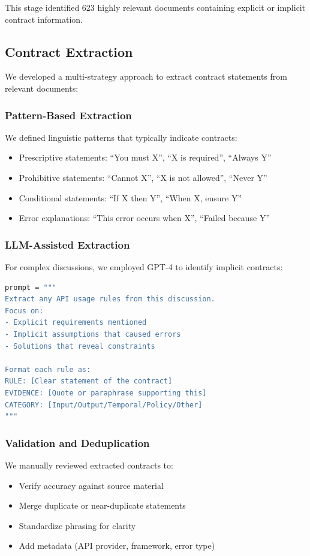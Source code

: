 \documentclass[11pt]{article}
\begin{document}
This stage identified 623 highly relevant documents containing explicit or implicit contract information.

\subsection{Contract Extraction}

We developed a multi-strategy approach to extract contract statements from relevant documents:

\subsubsection{Pattern-Based Extraction}
We defined linguistic patterns that typically indicate contracts:
\begin{itemize}
    \item Prescriptive statements: ``You must X'', ``X is required'', ``Always Y''
    \item Prohibitive statements: ``Cannot X'', ``X is not allowed'', ``Never Y''
    \item Conditional statements: ``If X then Y'', ``When X, ensure Y''
    \item Error explanations: ``This error occurs when X'', ``Failed because Y''
\end{itemize}

\subsubsection{LLM-Assisted Extraction}
For complex discussions, we employed GPT-4 to identify implicit contracts:

\begin{lstlisting}[language=Python, caption={Contract Extraction Prompt}]
prompt = """
Extract any API usage rules from this discussion.
Focus on:
- Explicit requirements mentioned
- Implicit assumptions that caused errors
- Solutions that reveal constraints

Format each rule as:
RULE: [Clear statement of the contract]
EVIDENCE: [Quote or paraphrase supporting this]
CATEGORY: [Input/Output/Temporal/Policy/Other]
"""
\end{lstlisting}

\subsubsection{Validation and Deduplication}
We manually reviewed extracted contracts to:
\begin{itemize}
    \item Verify accuracy against source material
    \item Merge duplicate or near-duplicate statements
    \item Standardize phrasing for clarity
    \item Add metadata (API provider, framework, error type)
\end{itemize}
\end{document}
